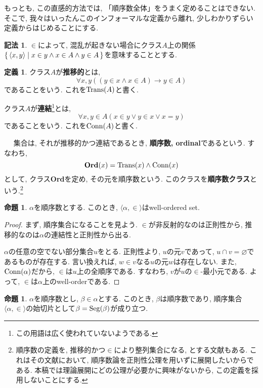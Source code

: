 \documentclass[a4paper, twoside]{bxjsarticle}
\theoremstyle{definition}
\newtheorem{prop}[thm]{命題}
\newtheorem{defn}[thm]{定義}
\newtheorem{notation}[thm]{記法}
\begin{document}
    もっとも, この直感的方法では, 「順序数全体」をうまく定めることはできない. そこで, 我々はいったんこのインフォーマルな定義から離れ, 少しわかりずらい定義からはじめることにする. 
        \begin{notation}
            $\in$によって, 混乱が起きない場合にクラス$A$上の関係$\set{\langle x, y\rangle|x\in y \land x\in A\land y\in A}$を意味することとする. 
        \end{notation}
        \begin{defn}
            クラス$A$が\textbf{推移的}とは, \[\forall x, y ((y\in x \land x\in A)\to y\in A)\]であることをいう. これを${\rm Trans}(A)$と書く.
            
            クラス$A$が\textbf{連結}\footnote{この用語は広く使われていないようである.}とは, \[\forall x, y\in A (x\in y \lor y\in x \lor x=y)\]であることをいう. これを${\rm Conn}(A)$と書く.
            
            　
            集合は, それが推移的かつ連結であるとき, \textbf{順序数, ordinal}であるという. すなわち, \[\textbf{Ord}(x) = {\rm Trans}(x) \land {\rm Conn}(x)\]として, クラス\textbf{Ord}を定め, その元を順序数という. このクラスを\textbf{順序数クラス}という.\footnote{順序数の定義を, 推移的かつ$\in$により整列集合になる, とする文献もある. これはその文献において, 順序数論を正則性公理を用いずに展開したいからである. 本稿では理論展開にどの公理が必要かに興味がないから, この定義を採用しないことにする.}
        \end{defn}
        \begin{prop}
            $\alpha$を順序数とする. このとき, $\langle \alpha, \in \rangle$はwell-ordered set.
        \end{prop}
        \begin{proof}
            まず, 順序集合になることを見よう. $\in$が非反射的なのは正則性から, 推移的なのは$\alpha$の連結性と正則性から出る.
        
            $\alpha$の任意の空でない部分集合$u$をとる. 正則性より, $u$の元$v$であって, $u\cap v = \varnothing$であるものが存在する. 言い換えれば, $w\in v$なる$u$の元$w$は存在しない. また, ${\rm Conn}(\alpha)$だから, $\in$は$u$上の全順序である. すなわち, $v$が$u$の$\in$-最小元である. よって, $\in$は$\alpha$上のwell-orderである.
        \end{proof}
        \begin{prop}
            $\alpha$を順序数とし, $\beta \in \alpha$とする. このとき, $\beta$は順序数であり, 順序集合$\langle \alpha, \in\rangle$の始切片として$\beta = {\rm Seg}(\beta)$が成り立つ.
        \end{prop}
\end{document}
